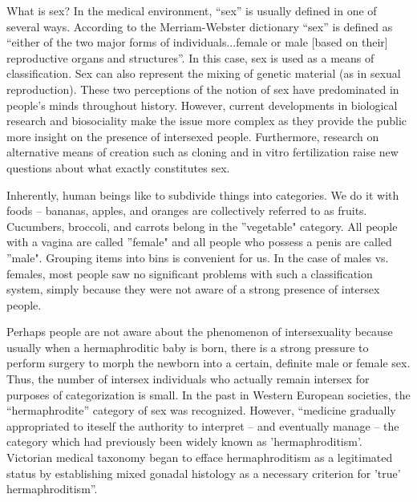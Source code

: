 
%
%

What is sex? In the medical environment, “sex” is usually defined in one of several ways. According to the Merriam-Webster dictionary “sex” is defined as “either of the two major forms of individuals...female or male [based on their] reproductive organs and structures”. \cite{webster} In this case, sex is used as a means of classification.  Sex can also represent the mixing of genetic material (as in sexual reproduction).  These two perceptions of the notion of sex have predominated in people's minds throughout history. However, current developments in biological research and biosociality make the issue more complex as they provide the public more insight on the presence of intersexed people. Furthermore, research on alternative means of creation such as cloning and in vitro fertilization raise new questions about what exactly constitutes sex.


Inherently, human beings like to subdivide things into categories. We do it with foods -- bananas, apples, and oranges are collectively referred to as fruits. Cucumbers, broccoli, and carrots belong in the ''vegetable" category. All people with a vagina are called ''female" and all people who possess a penis are called ''male".  Grouping items into bins is convenient for us. In the case of males vs. females, most people saw no significant problems with such a classification system, simply because they were not aware of a strong presence of intersex people. 

	Perhaps people are not aware about the phenomenon of intersexuality because usually when a hermaphroditic baby is born, there is a strong pressure to perform surgery to morph the newborn into a certain, definite male or female sex. Thus, the number of intersex individuals who actually remain intersex for purposes of categorization is small. In the past in Western European societies, the “hermaphrodite” category of sex was recognized.  However, “medicine gradually appropriated to iteself the authority to interpret -- and eventually manage – the category which had previously been widely known as 'hermaphroditism'. Victorian medical taxonomy began to efface hermaphroditism as a legitimated status by establishing mixed gonadal histology as a necessary criterion for 'true' hermaphroditism”. \cite{chase} 

